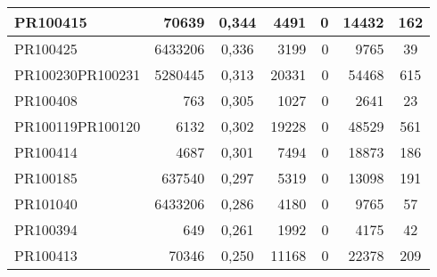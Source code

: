 \begin{center}
\begin{longtable}{lr|c|rrr|c}
	PR100415 & 70639 & 0,344 & 4491 & 0 & 14432 & 162 \\ \hline
	PR100425 & 6433206 & 0,336 & 3199 & 0 & 9765 & 39 \\ \hline
	PR100230PR100231 & 5280445 & 0,313 & 20331 & 0 & 54468 & 615 \\ \hline
	PR100408 & 763 & 0,305 & 1027 & 0 & 2641 & 23 \\ \hline
	PR100119PR100120 & 6132 & 0,302 & 19228 & 0 & 48529 & 561 \\ \hline
	PR100414 & 4687 & 0,301 & 7494 & 0 & 18873 & 186 \\ \hline
	PR100185 & 637540 & 0,297 & 5319 & 0 & 13098 & 191 \\ \hline
	PR101040 & 6433206 & 0,286 & 4180 & 0 & 9765 & 57 \\ \hline
	PR100394 & 649 & 0,261 & 1992 & 0 & 4175 & 42 \\ \hline
	PR100413 & 70346 & 0,250 & 11168 & 0 & 22378 & 209 \\ \hline
	
\end{longtable}
\end{center}
